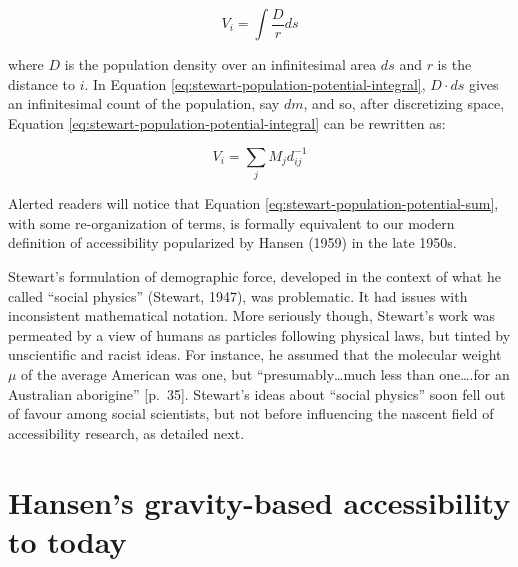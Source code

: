 \documentclass[
11pt, %
oneside, %
english, %
singlespacing, %
]{macthesis} %
\begin{document}
\begin{equation}
\label{eq:stewart-population-potential-integral}
V_i = \int\frac{D}{r} ds
\end{equation} 

\noindent where \(D\) is the population density over an infinitesimal area \(ds\) and \(r\) is the distance to \(i\). In Equation \ref{eq:stewart-population-potential-integral}, \(D\cdot ds\) gives an infinitesimal count of the population, say \(dm\), and so, after discretizing space, Equation \ref{eq:stewart-population-potential-integral} can be rewritten as:

\begin{equation}
\label{eq:stewart-population-potential-sum}
V_i = \sum_j M_jd_{ij}^{-1}
\end{equation} 

Alerted readers will notice that Equation \ref{eq:stewart-population-potential-sum}, with some re-organization of terms, is formally equivalent to our modern definition of accessibility popularized by Hansen (1959) in the late 1950s.

Stewart's formulation of demographic force, developed in the context of what he called ``social physics'' (Stewart, 1947), was problematic. It had issues with inconsistent mathematical notation. More seriously though, Stewart's work was permeated by a view of humans as particles following physical laws, but tinted by unscientific and racist ideas. For instance, he assumed that the molecular weight \(\mu\) of the average American was one, but ``presumably\ldots much less than one\ldots.for an Australian aborigine'' {[}p.~35{]}. Stewart's ideas about ``social physics'' soon fell out of favour among social scientists, but not before influencing the nascent field of accessibility research, as detailed next.

\section{Hansen's gravity-based accessibility to today}\label{grav-to-today}
\end{document}
